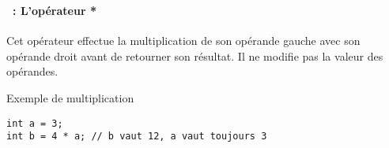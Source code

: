\begin{frame}[containsverbatim]
  \frametitle{\secname}
  \framesubtitle{\subsecname~: L'opérateur *} 

  Cet opérateur effectue la multiplication de son opérande gauche avec son opérande droit avant de retourner son résultat. Il ne modifie pas la valeur
  des opérandes.
  \vspace{0.5cm}
  \begin{exampleblock}{Exemple de multiplication}
    \begin{verbatim}
int a = 3;
int b = 4 * a; // b vaut 12, a vaut toujours 3\end{verbatim}
  \end{exampleblock}

\end{frame}

